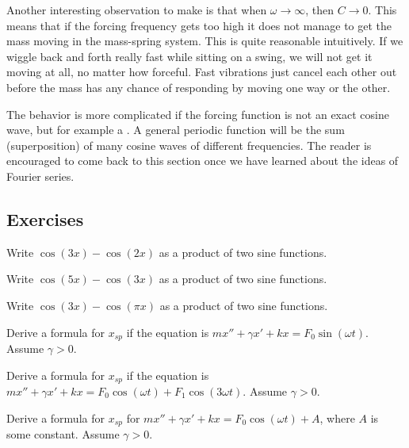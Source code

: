 
Another interesting observation to make is that when $\omega \to \infty$,
then $C \to 0$.  This means that if the forcing frequency gets too high it
does not manage to get the mass moving in the mass-spring system.  This is
quite reasonable intuitively.
If we wiggle back and forth really fast while sitting on a swing, we will
not get it moving at all, no matter how forceful.  Fast
vibrations just cancel each other out before the mass has any chance of
responding by moving one way or the other.

The behavior is more complicated if the forcing function is not an
exact cosine wave, but for example a .
A general periodic function will be the sum (superposition) of many
cosine waves of different frequencies.
The reader is encouraged to come
back to this section once we have learned about the ideas of Fourier series.

\subsection{Exercises}

\begin{exercise}
Write $\cos(3x) - \cos(2x)$ as a product of two sine functions.
\end{exercise}

\begin{exercise}
Write $\cos(5x) - \cos(3x)$ as a product of two sine functions.
\end{exercise}

\begin{exercise}
Write $\cos(3x) - \cos(\pi x)$ as a product of two sine functions.
\end{exercise}

\begin{exercise}
Derive a formula for $x_{sp}$ if the equation is
$m x'' + \gamma x' + kx = F_0 \sin (\omega t)$.  Assume $\gamma > 0$.
\end{exercise}

\begin{exercise}
Derive a formula for $x_{sp}$ if the equation is
$m x'' + \gamma x' + kx = F_0 \cos (\omega t) + F_1 \cos (3\omega t)$.
Assume $\gamma > 0$.
\end{exercise}

\begin{exercise}\ansMark%
Derive a formula for $x_{sp}$ for
$mx''+\gamma x'+kx = F_0 \cos(\omega t) + A$,
where $A$ is some constant.  Assume $\gamma > 0$.
\end{exercise}

